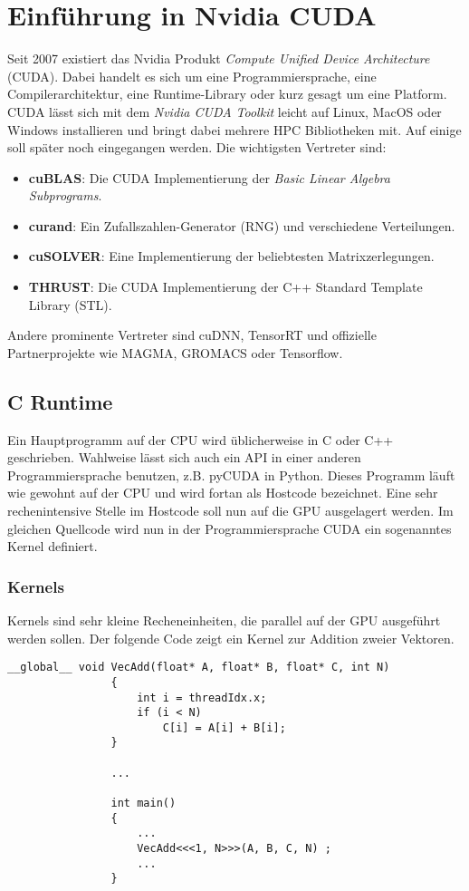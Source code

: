 	\chapter{Einf\"uhrung in Nvidia CUDA}
	Seit 2007 existiert das Nvidia Produkt \textit{Compute Unified Device Architecture} (CUDA). Dabei handelt es sich um eine Programmiersprache, eine Compilerarchitektur, eine Runtime-Library oder kurz gesagt um eine Platform. CUDA lässt sich mit dem \textit{Nvidia CUDA Toolkit} leicht auf Linux, MacOS oder Windows installieren und bringt dabei mehrere HPC Bibliotheken mit. Auf einige soll später noch eingegangen werden. Die wichtigsten Vertreter sind:
	\begin{itemize}
		\item \textbf{cuBLAS}:   Die CUDA Implementierung der \textit{Basic Linear Algebra Subprograms}.
		\item \textbf{curand}:   Ein Zufallszahlen-Generator (RNG) und verschiedene Verteilungen.
		\item \textbf{cuSOLVER}: Eine Implementierung der beliebtesten Matrixzerlegungen.
		\item \textbf{THRUST}:   Die CUDA Implementierung der C++ Standard Template Library (STL).
	\end{itemize}
	Andere prominente Vertreter sind cuDNN, TensorRT und offizielle Partnerprojekte wie MAGMA, GROMACS oder Tensorflow.
				
		
		\section{C Runtime}
		Ein Hauptprogramm auf der CPU wird üblicherweise in C oder C++ geschrieben. Wahlweise lässt sich auch ein \Gls{API} in einer anderen Programmiersprache benutzen, z.B. pyCUDA in Python. Dieses Programm läuft wie gewohnt auf der CPU und wird fortan als Hostcode bezeichnet. Eine sehr rechenintensive Stelle im  Hostcode soll nun auf die GPU ausgelagert werden. Im gleichen Quellcode wird nun in der Programmiersprache CUDA ein sogenanntes \Gls{Kernel} definiert.
			\subsection*{Kernels}
			\Glspl{Kernel} sind sehr kleine Recheneinheiten, die parallel auf der GPU ausgeführt werden sollen. Der folgende Code zeigt ein \Gls{Kernel} zur Addition zweier Vektoren.
	  		\begin{lstlisting}[caption=Vektoraddition Kernel]
				__global__ void VecAdd(float* A, float* B, float* C, int N)
				{
    				int i = threadIdx.x;
    				if (i < N)
        				C[i] = A[i] + B[i];
				}
				
				...
				
				int main()
				{		
					...
					VecAdd<<<1, N>>>(A, B, C, N) ;
					...
				}
			\end{lstlisting}
			
